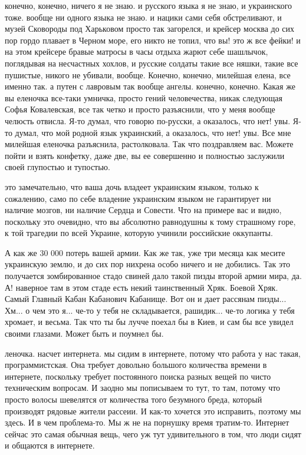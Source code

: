 конечно, конечно, ничего я не знаю. и русского языка я не знаю, и украинского
тоже. вообще ни одного языка не знаю. и нацики сами себя обстреливают, и музей
Сковороды под Харьковом просто так загорелся, и крейсер москва до сих пор гордо
плавает в Черном море, его никто не топил, что вы! это ж все фейки! и на этом
крейсере бравые матросы в часы отдыха жарют себе шашлычок, поглядывая на
несчастных хохлов, и русские солдаты такие все няшки, такие все пушистые,
никого не убивали, вообще. Конечно, конечно, милейшая елена, все именно так. а
путен с лавровым так вообще ангелы. конечно, конечно. Какая же вы еленочка
все-таки умничка, просто гений человечества, никак следующая Софья Ковалевская,
все так четко и просто разъяснили, что у меня вообще челюсть отвисла. Я-то
думал, что говорю по-русски, а оказалось, что нет! увы. Я-то думал, что мой
родной язык украинский, а оказалось, что нет! увы. Все мне милейшая еленочка
разъяснила, растолковала. Так что поздравляем вас. Можете пойти и взять
конфетку, даже две, вы ее совершенно и полностью заслужили своей глупостью и
тупостью.

это замечательно, что ваша дочь владеет украинским языком, только к сожалению,
само по себе владение украинским языком не гарантирует ни наличие мозгов, ни
наличие Сердца и Совести. Что на примере вас и видно, поскольку это очевидно,
что вы абсолютно равнодушны к тому страшному горе, к той трагедии по всей
Украине, которую учинили российские оккупанты.

А как же 30 000 потерь вашей армии. Как же так, уже три месяца как месите
украинскую землю, и до сих пор нихрена особо ничего и не добились. Так это
получается зомбированное стадо свиней дало такой пизды второй армии мира, да.
А! наверное там в этом стаде есть некий таинственный Хряк. Боевой Хряк. Самый
Главный Кабан Кабанович Кабанище. Вот он и дает рассянам пизды... Хм... о чем
это я... че-то у тебя не складывается, рашидик... че-то логика у тебя хромает,
и весьма. Так что ты бы лучче поехал бы в Киев, и сам бы все увидел своими
глазами. Может быть и поумнел бы.

леночка. насчет интернета. мы сидим в интернете, потому что работа у нас такая,
программистская. Она требует довольно большого количества времени в интернете,
поскольку требует постоянного поиска разных вещей по чисто техническим
вопросам. И заодно мы пописываем то тут, то там, потому что просто волосы
шевелятся от количества того безумного бреда, который производят рядовые жители
рассеии. И как-то хочется это исправить, поэтому мы здесь. И в чем проблема-то.
Мы ж не на порнушку время тратим-то. Интернет сейчас это самая обычная вещь,
чего уж тут удивительного в том, что люди сидят и общаются в интернете.

